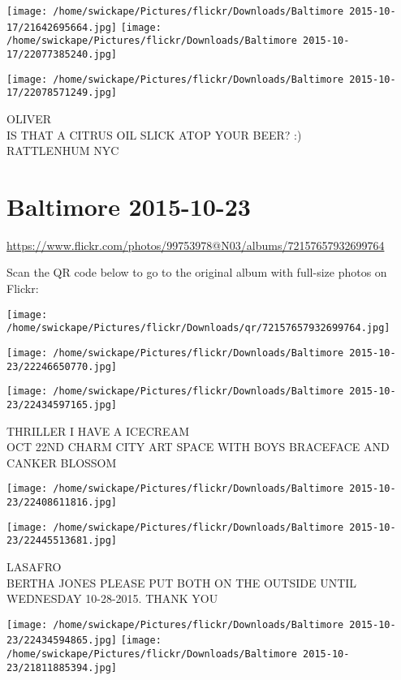 \documentclass[10pt,letterpaper]{article}
\begin{document}
\texttt{[image: /home/swickape/Pictures/flickr/Downloads/Baltimore 2015-10-17/21642695664.jpg]}
\texttt{[image: /home/swickape/Pictures/flickr/Downloads/Baltimore 2015-10-17/22077385240.jpg]}

\texttt{[image: /home/swickape/Pictures/flickr/Downloads/Baltimore 2015-10-17/22078571249.jpg]}

OLIVER\\
IS THAT A CITRUS OIL SLICK ATOP YOUR BEER? :)\\
RATTLENHUM NYC
\pagebreak

\section*{Baltimore 2015-10-23}

\url{https://www.flickr.com/photos/99753978@N03/albums/72157657932699764}

Scan the QR code below to go to the original album with full-size photos on Flickr:

\texttt{[image: /home/swickape/Pictures/flickr/Downloads/qr/72157657932699764.jpg]}
\pagebreak

\texttt{[image: /home/swickape/Pictures/flickr/Downloads/Baltimore 2015-10-23/22246650770.jpg]}

\vspace{0.25in}
\texttt{[image: /home/swickape/Pictures/flickr/Downloads/Baltimore 2015-10-23/22434597165.jpg]}

THRILLER I HAVE A ICECREAM\\
OCT 22ND CHARM CITY ART SPACE WITH BOYS BRACEFACE AND CANKER BLOSSOM
\pagebreak

\texttt{[image: /home/swickape/Pictures/flickr/Downloads/Baltimore 2015-10-23/22408611816.jpg]}

\vspace{0.25in}
\texttt{[image: /home/swickape/Pictures/flickr/Downloads/Baltimore 2015-10-23/22445513681.jpg]}

LASAFRO\\
BERTHA JONES PLEASE PUT BOTH ON THE OUTSIDE UNTIL WEDNESDAY 10{-}28{-}2015.  THANK YOU
\pagebreak

\texttt{[image: /home/swickape/Pictures/flickr/Downloads/Baltimore 2015-10-23/22434594865.jpg]}
\texttt{[image: /home/swickape/Pictures/flickr/Downloads/Baltimore 2015-10-23/21811885394.jpg]}
\end{document}
